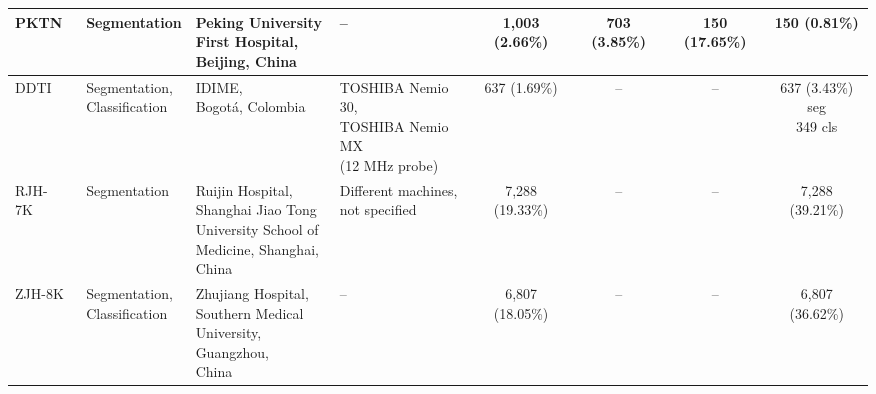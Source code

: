 \documentclass[fleqn,10pt]{wlscirep}
\begin{document}
\begin{appendices}
\begin{table}[p]
{\begin{tabular}{llllcccc}
PKTN~\cite{sun2025clip} & Segmentation & \makecell[l]{Peking University\\First Hospital,\\Beijing, China} & -- & 1{,}003 (2.66\%) & 703 (3.85\%) & 150 (17.65\%) & 150 (0.81\%) \\
\midrule
DDTI~\cite{pedraza2015open} & \makecell[c]{Segmentation,\\Classification} & \makecell[l]{IDIME,\\Bogot\'{a}, Colombia} & \makecell[l]{TOSHIBA Nemio 30,\\TOSHIBA Nemio MX\\(12 MHz probe)} & 637 (1.69\%) & -- & -- & \makecell[c]{637 (3.43\%) seg\\349 cls} \\
RJH-7K~\cite{shusharina2021segmentation} & Segmentation & \makecell[l]{Ruijin Hospital,\\Shanghai Jiao Tong\\University School of\\Medicine, Shanghai,\\China} & \makecell[l]{Different machines,\\not specified} & 7{,}288 (19.33\%) & -- & -- & 7{,}288 (39.21\%) \\
ZJH-8K & \makecell[c]{Segmentation,\\Classification} & \makecell[l]{Zhujiang Hospital,\\Southern Medical\\University, Guangzhou,\\China} & -- & 6{,}807 (18.05\%) & -- & -- & 6{,}807 (36.62\%) \\
\bottomrule
\end{tabular}%
}
\end{table}
\clearpage

\begin{table}[p]
\centering
\caption{Characteristics of public and institutional thyroid ultrasound datasets. Dataset size, data split, file format, task, geographical source and ultrasound scanner information are summarized for the included resources.}
\label{tab:dataset_comparison}
\end{table}
\end{appendices}
\end{document}
